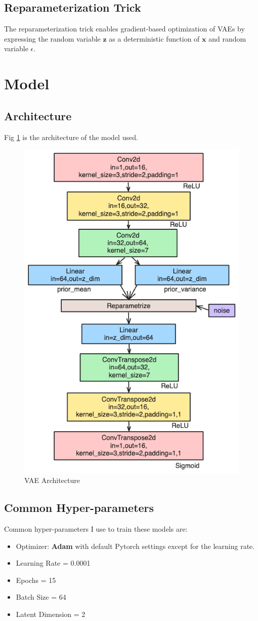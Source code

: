 \documentclass[12pt]{article}
\begin{document}
\subsection{Reparameterization Trick}
The reparameterization trick enables gradient-based optimization of VAEs by expressing the random variable $\mathbf{z}$ as a deterministic function of $\mathbf{x}$ and random variable $\epsilon$. 
\section{Model}

\subsection{Architecture}
Fig \ref{fig:architecture} is the architecture of the model used.
\begin{figure}[h]
\centering
\includegraphics[width=0.5\linewidth]{report_images/architecture.png}
\caption{\label{fig:architecture}VAE Architecture}
\end{figure}

\subsection{Common Hyper-parameters}
Common hyper-parameters I use to train these models are:
\begin{itemize}
\item Optimizer: \textbf{Adam} with default Pytorch settings except for the learning rate.
\item Learning Rate = 0.0001
\item Epochs = 15
\item Batch Size = 64
\item Latent Dimension = 2
\end{itemize}
\end{document}

